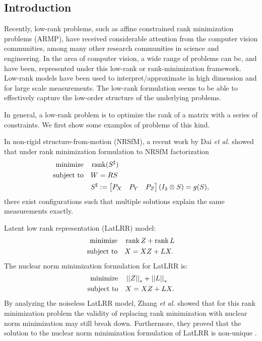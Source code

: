 \documentclass[11pt]{article}
\begin{document}
\subsection{Introduction}

Recently, low-rank problems, such as affine constrained rank minimization problems (ARMP), have received considerable attention from the computer vision communities, among many other research communities in science and engineering. In the area of computer vision, a wide range of problems can be, and have been, represented under this low-rank or rank-minimization framework. Low-rank models have been used to interpret/approximate in high dimension and for large scale measurements. The low-rank formulation seems to be able to effectively capture the low-order structure of the underlying problems.

In general, a low-rank problem is to optimize the rank of a matrix with a series of constraints. We first show some examples of problems of this kind.

\begin{example}
    In non-rigid structure-from-motion (NRSfM), a recent work by Dai \emph{et al.} \cite{dai2014simple} showed that under rank minimization formulation to NRSfM factorization
    \[\begin{aligned}
        \textnormal{minimize}\quad & \operatorname{rank}(S^{\sharp})\\
        \textnormal{subject to}\quad & W=RS\\
        & S^{\sharp}:=\begin{bmatrix}P_X & P_Y & P_Z\end{bmatrix}\left(I_3\otimes S\right)=g(S),
    \end{aligned}\]
    there exist configurations such that multiple solutions explain the same measurements exactly.
\end{example}

\begin{example}\label{eg:latlrr}
    Latent low rank representation (LatLRR) model:
    \[\begin{aligned}
        \textnormal{minimize}\quad & \operatorname{rank} Z+\operatorname{rank} L\\
        \textnormal{subject to}\quad & X=XZ+LX.
    \end{aligned}\]
    The nuclear norm minimization formulation for LatLRR is:
    \[\begin{aligned}
        \textnormal{minimize}\quad & \left|\left|Z\right|\right|_\ast+\left|\left|L\right|\right|_\ast\\
        \textnormal{subject to}\quad & X=XZ+LX.
    \end{aligned}\]
    By analyzing the noiseless LatLRR model, Zhang \emph{et al.} \cite{zhang2013counterexample} showed that for this rank minimization problem the validity of replacing rank minimization with nuclear norm minimization may still break down. Furthermore, they proved that the solution to the nuclear norm minimization formulation of LatLRR is non-unique \cite{dai2014rank}.
\end{example}
\end{document}
